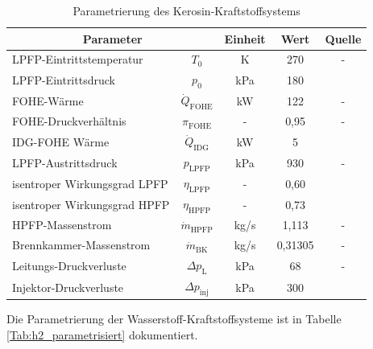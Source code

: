 \begin{table}[ht]
    \centering
	\caption{Parametrierung des Kerosin-Kraftstoffsystems}
	\begin{tabular} {|l|c|c|c|c|} \hline%
		\multicolumn{2}{|c|}{Parameter} & Einheit & Wert & Quelle\\ \hline\hline%
        LPFP-Eintrittstemperatur & $T_0$ & K & 270 & - \\ \hline
        LPFP-Eintrittsdruck & $p_0$ & kPa & 180 & \cite{EatonFuelSystemsDivision.2013} \\ \hline
        FOHE-Wärme & $\dot{Q}_{\mathrm{FOHE}}$ & kW & 122 & - \\ \hline
        FOHE-Druckverhältnis & $\pi_{\mathrm{FOHE}}$ & - & 0,95 & - \\ \hline
        IDG-FOHE Wärme  & $\dot{Q}_\mathrm{IDG}$ & kW & 5 & \cite{Sciatti.2024} \\ \hline
        LPFP-Austrittsdruck & $p_\mathrm{LPFP}$ & kPa & 930 & - \\ \hline
        isentroper Wirkungsgrad LPFP & $\eta_\mathrm{LPFP}$ & - & 0,60 & \cite{Zhou.2023} \\ \hline
        isentroper Wirkungsgrad HPFP & $\eta_\mathrm{HPFP}$ & - & 0,73 & \cite{Xu.2024} \\ \hline
        HPFP-Massenstrom & $\dot{m}_\mathrm{HPFP}$ & kg/s & 1,113 & - \\ \hline
        Brennkammer-Massenstrom & $\dot{m}_\mathrm{BK}$ & kg/s & 0,31305 & - \\ \hline
        Leitungs-Druckverluste & $\Delta p_\mathrm{L}$ & kPa & 68 & - \\ \hline
        Injektor-Druckverluste & $\Delta p_\mathrm{inj}$ & kPa & 300 & \cite{Mazaheri.2012} \\ \hline
	\end{tabular}	
    \label{Tab:referenz_parametrisiert}%
\end{table}
\FloatBarrier 

Die Parametrierung der Wasserstoff-Kraftstoffsysteme ist in Tabelle \ref{Tab:h2_parametrisiert} dokumentiert.

